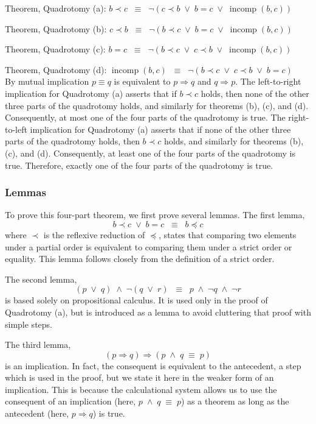 \documentclass[12pt, fleqn, leqno]{article}
\newcommand{\equivs}{\ensuremath{\;\equiv\;}}       %
\newcommand{\equivss}{\ensuremath{\;\;\equiv\;\;}}  %
\newcommand{\lors}{\ensuremath{\;\lor\;}}           %
\newcommand{\lands}{\ensuremath{\;\land\;}}         %
\newcommand{\impl}{\ensuremath{\Rightarrow}}        %
\DeclareMathOperator{\incomp}{incomp}
\begin{document}
Theorem, Quadrotomy (a): $b \prec c \equivss \lnot(c \prec b \lors b = c \lors \incomp(b, c))$

Theorem, Quadrotomy (b): $c \prec b \equivss \lnot(b \prec c \lors b = c \lors \incomp(b, c))$

Theorem, Quadrotomy (c): $b = c \equivss \lnot(b \prec c \lors c \prec b \lors \incomp(b, c))$

Theorem, Quadrotomy (d): $\incomp(b, c) \equivss \lnot(b \prec c \lors c \prec b \lors b = c)$\\
By mutual implication $p\equiv q$ is equivalent to $p\impl q$ and $q\impl p$.
The left-to-right implication for Quadrotomy (a) asserts that if $b\prec c$ holds, then none of the other three parts of the quadrotomy holds, and similarly for theorems (b), (c), and (d).
Consequently, at most one of the four parts of the quadrotomy is true.
The right-to-left implication for Quadrotomy (a) asserts that if none of the other three parts of the quadrotomy holds, then $b\prec c$ holds, and similarly for theorems (b), (c), and (d).
Consequently, at least one of the four parts of the quadrotomy is true.
Therefore, exactly one of the four parts of the quadrotomy is true.

\subsubsection{Lemmas}

To prove this four-part theorem, we first prove several lemmas.
The first lemma,
\[
b \prec c \lors b = c \equivss b \preceq c
\]
where $\prec$ is the reflexive reduction of $\preceq$, states that comparing two elements under a partial order is equivalent to comparing them under a strict order or equality.
This lemma follows closely from the definition of a strict order.

The second lemma,
\[
(p \lors q) \lands \lnot (q \lors r) \equivss p \lands \lnot q \lands \lnot r
\]
is based solely on propositional calculus.
It is used only in the proof of Quadrotomy (a), but is introduced as a lemma to avoid cluttering that proof with simple steps.

The third lemma,
\[
(p \impl q) \impl (p \lands q \equivs p)
\]is an implication.
In fact, the consequent is equivalent to the antecedent, a step which is used in the proof, but we state it here in the weaker form of an implication.
This is because the calculational system allows us to use the consequent of an implication (here, $p \lands q \equivs p$) as a theorem as long as the antecedent (here, $p \impl q$) is true.
\end{document}
